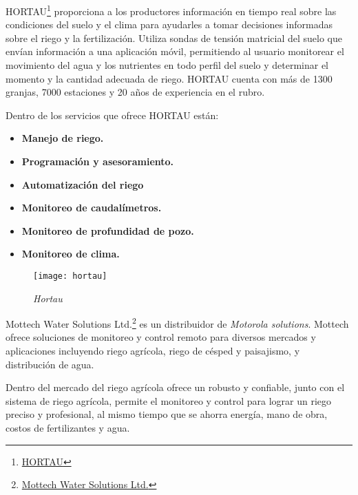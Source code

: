 HORTAU\footnote{\href{https://hortau.com/es/}{HORTAU}} proporciona a los productores información en tiempo real sobre las condiciones del suelo y el clima para ayudarles a tomar decisiones informadas sobre el riego y la fertilización.
Utiliza sondas de tensión matricial del suelo que envían información a una aplicación móvil, permitiendo al usuario monitorear el movimiento del agua y los nutrientes en todo perfil del suelo y determinar el momento y la cantidad adecuada de riego.
HORTAU cuenta con más de 1300 granjas, 7000 estaciones y 20 años de experiencia en el rubro.

Dentro de los servicios que ofrece HORTAU están:
\begin{itemize}
    \item \textbf{Manejo de riego.}
    \item \textbf{Programación y asesoramiento.}
    \item \textbf{Automatización del riego}
    \item \textbf{Monitoreo de caudalímetros.}
    \item \textbf{Monitoreo de profundidad de pozo.}
    \item \textbf{Monitoreo de clima.}
\end{itemize}

\begin{figure}[H]
	\centering
	\texttt{[image: hortau]}
	\caption{\label{fig:netafim} \textit{Hortau}}
\end{figure}

Mottech Water Solutions Ltd.\footnote{\href{https://mottech.com/}{Mottech Water Solutions Ltd.}} es un distribuidor de \textit{Motorola solutions}. Mottech ofrece soluciones de monitoreo y control remoto para diversos mercados y aplicaciones incluyendo riego agrícola, riego de césped y paisajismo, y distribución de agua.

Dentro del mercado del riego agrícola ofrece un  robusto y confiable, junto con el sistema de riego agrícola, permite el monitoreo y control para lograr un riego preciso y profesional, al mismo tiempo que se ahorra energía, mano de obra, costos de fertilizantes y agua.

